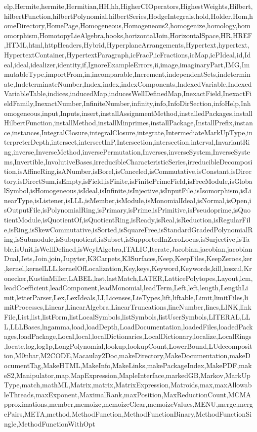 {elp,Hermite,hermite,Hermitian,HH,hh,HigherCIOperators,HighestWeights,Hilbert,hilbertFunction,hilbertPolynomial,hilbertSeries,HodgeIntegrals,hold,Holder,Hom,homeDirectory,HomePage,Homogeneous,Homogeneous2,homogenize,homology,homomorphism,HomotopyLieAlgebra,hooks,horizontalJoin,HorizontalSpace,HR,HREF,HTML,html,httpHeaders,Hybrid,HyperplaneArrangements,Hypertext,hypertext,HypertextContainer,HypertextParagraph,icFracP,icFractions,icMap,icPIdeal,id,Ideal,ideal,idealizer,identity,if,IgnoreExampleErrors,ii,image,imaginaryPart,IMG,ImmutableType,importFrom,in,incomparable,Increment,independentSets,indeterminate,IndeterminateNumber,Index,index,indexComponents,IndexedVariable,IndexedVariableTable,indices,inducedMap,inducesWellDefinedMap,InexactField,InexactFieldFamily,InexactNumber,InfiniteNumber,infinity,info,InfoDirSection,infoHelp,Inhomogeneous,input,Inputs,insert,installAssignmentMethod,installedPackages,installHilbertFunction,installMethod,installMinprimes,installPackage,InstallPrefix,instance,instances,IntegralClosure,integralClosure,integrate,IntermediateMarkUpType,interpreterDepth,intersect,intersectInP,Intersection,intersection,interval,InvariantRing,inverse,InverseMethod,inversePermutation,Inverses,inverseSystem,InverseSystems,Invertible,InvolutiveBases,irreducibleCharacteristicSeries,irreducibleDecomposition,isAffineRing,isANumber,isBorel,isCanceled,isCommutative,isConstant,isDirectory,isDirectSum,isEmpty,isField,isFinite,isFinitePrimeField,isFreeModule,isGlobalSymbol,isHomogeneous,isIdeal,isInfinite,isInjective,isInputFile,isIsomorphism,isLinearType,isListener,isLLL,isMember,isModule,isMonomialIdeal,isNormal,isOpen,isOutputFile,isPolynomialRing,isPrimary,isPrime,isPrimitive,isPseudoprime,isQuotientModule,isQuotientOf,isQuotientRing,isReady,isReal,isReduction,isRegularFile,isRing,isSkewCommutative,isSorted,isSquareFree,isStandardGradedPolynomialRing,isSubmodule,isSubquotient,isSubset,isSupportedInZeroLocus,isSurjective,isTable,isUnit,isWellDefined,isWeylAlgebra,ITALIC,Iterate,Jacobian,jacobian,jacobianDual,Jets,Join,join,Jupyter,K3Carpets,K3Surfaces,Keep,KeepFiles,KeepZeroes,ker,kernel,kernelLLL,kernelOfLocalization,Key,keys,Keyword,Keywords,kill,koszul,Kronecker,KustinMiller,LABEL,last,lastMatch,LATER,LatticePolytopes,Layout,lcm,leadCoefficient,leadComponent,leadMonomial,leadTerm,Left,left,length,LengthLimit,letterParser,Lex,LexIdeals,LI,Licenses,LieTypes,lift,liftable,Limit,limitFiles,limitProcesses,Linear,LinearAlgebra,LinearTruncations,lineNumber,lines,LINK,linkFile,List,list,listForm,listLocalSymbols,listSymbols,listUserSymbols,LITERAL,LLL,LLLBases,lngamma,load,loadDepth,LoadDocumentation,loadedFiles,loadedPackages,loadPackage,Local,local,localDictionaries,LocalDictionary,localize,LocalRings,locate,log,log1p,LongPolynomial,lookup,lookupCount,LowerBound,LUdecomposition,M0nbar,M2CODE,Macaulay2Doc,makeDirectory,MakeDocumentation,makeDocumentTag,MakeHTML,MakeInfo,MakeLinks,makePackageIndex,MakePDF,makeS2,Manipulator,map,MapExpression,MapleInterface,markedGB,Markov,MarkUpType,match,mathML,Matrix,matrix,MatrixExpression,Matroids,max,maxAllowableThreads,maxExponent,MaximalRank,maxPosition,MaxReductionCount,MCMApproximations,member,memoize,memoizeClear,memoizeValues,MENU,merge,mergePairs,META,method,MethodFunction,MethodFunctionBinary,MethodFunctionSingle,MethodFunctionWithOpt}
